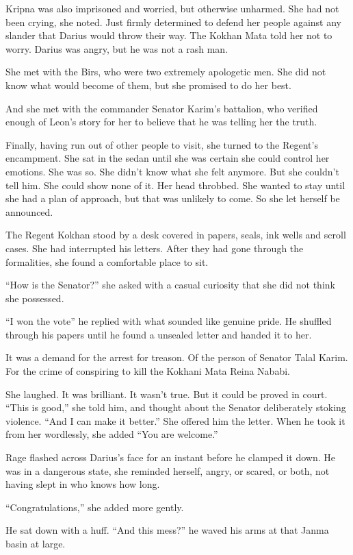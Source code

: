 \documentclass{article}
\begin{document}
	Kripna was also imprisoned and worried, but otherwise unharmed. She had not been crying, she noted. Just firmly determined to defend her people against any slander that Darius would throw their way. The Kokhan Mata told her not to worry. Darius was angry, but he was not a rash man.
	
	She met with the Birs, who were two extremely apologetic men. She did not know what would become of them, but she promised to do her best.
	
	And she met with the commander Senator Karim’s battalion, who verified enough of Leon’s story for her to believe that he was telling her the truth. 
	
	Finally, having run out of other people to visit, she turned to the Regent’s encampment. She sat in the sedan until she was certain she could control her emotions. She was so. She didn’t know what she felt anymore. But she couldn’t tell him. She could show none of it. Her head throbbed. She wanted to stay until she had a plan of approach, but that was unlikely to come. So she let herself be announced.
	
	The Regent Kokhan stood by a desk covered in papers, seals, ink wells and scroll cases. She had interrupted his letters. After they had gone through the formalities, she found a comfortable place to sit. 
	
	“How is the Senator?” she asked with a casual curiosity that she did not think she possessed.
	
	“I won the vote” he replied with what sounded like genuine pride. He shuffled through his papers until he found a unsealed letter and handed it to her. 
	
	It was a demand for the arrest for treason. Of the person of Senator Talal Karim. For the crime of conspiring to kill the Kokhani Mata Reina Nababi. 
	
	She laughed. It was brilliant. It wasn’t true. But it could be proved in court. “This is good,” she told him, and thought about the Senator deliberately stoking violence. “And I can make it better.” She offered him the letter. When he took it from her wordlessly, she added “You are welcome.” 
	
	Rage flashed across Darius’s face for an instant before he clamped it down. He was in a dangerous state, she reminded herself, angry, or scared, or both, not having slept in who knows how long. 
	
	“Congratulations,” she added more gently.
	
	He sat down with a huff. “And this mess?” he waved his arms at that Janma basin at large.
	
\end{document}
